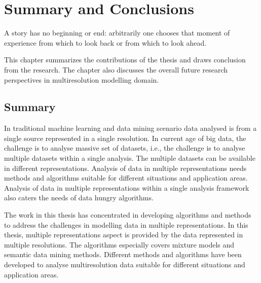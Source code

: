 \chapter[Summary and Conclusions]{Summary and Conclusions}
\label{ch:summary}

\begin{fquote}A story has no beginning or end: 
arbitrarily one chooses that moment of experience from which 
to look back or from which to look ahead.
 \end{fquote}

\begin{synopsis}
This chapter summarizes the contributions of the thesis
and draws conclusion from the research. The chapter also 
discusses the overall future research perspectives in 
multiresolution modelling domain. 
\end{synopsis}

\section{Summary}
\label{s:finsum}



In traditional machine learning and data mining scenario 
data analysed is from a single source represented in 
a single resolution. In current age of big data, the 
challenge is to analyse massive set of datasets, i.e., the 
challenge is to analyse  multiple datasets within a single analysis. The multiple 
datasets can be available in different representations. 
Analysis of data in multiple representations needs
methods and algorithms suitable for different 
situations and application areas. Analysis of 
data in multiple representations within a single analysis
framework also caters the needs of data hungry algorithms.

The work in this 
thesis has concentrated in developing algorithms
and methods to address the challenges in 
modelling data in multiple representations. 
In this thesis, multiple representations aspect is 
provided by the data represented in multiple resolutions.
The algorithms especially covers mixture models and 
semantic data mining methods. Different methods and 
algorithms have been developed to 
analyse multiresolution data suitable for different 
situations and application areas. 

